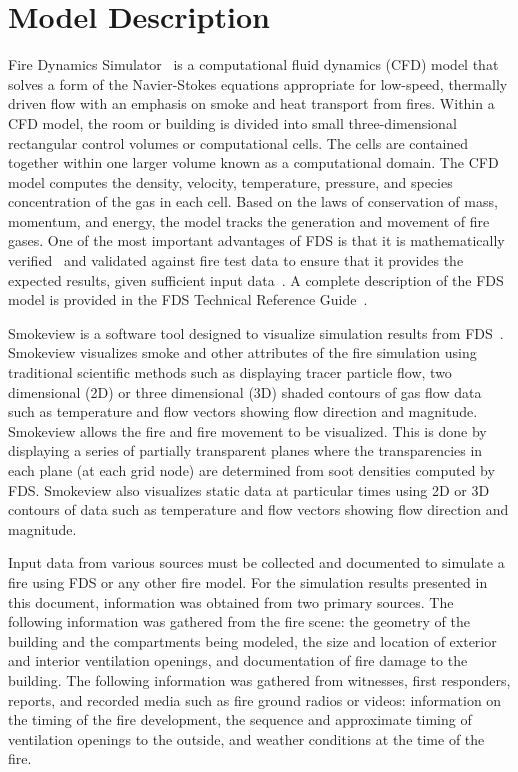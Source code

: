 \documentclass[12pt,oneside]{book}
\begin{document}
\chapter{Model Description}
\label{model}
Fire Dynamics Simulator~\cite{FDS_Users_Guide} is a computational fluid dynamics (CFD) model that solves a form of the Navier-Stokes equations appropriate for low-speed, thermally driven flow with an emphasis on smoke and heat transport from fires.  Within a CFD model, the room or building is divided into small three-dimensional rectangular control volumes or computational cells.  The cells are contained together within one larger volume known as a computational domain.  The CFD model computes the density, velocity, temperature, pressure, and species concentration of the gas in each cell.  Based on the laws of conservation of mass, momentum,  and energy, the model tracks the generation and movement of fire gases. One of the most important advantages of FDS is that it is  mathematically verified~\cite{FDS_Verification_Guide} and validated against fire test data to ensure that it provides the expected results, given sufficient input data~\cite{FDS_Validation_Guide}. A complete description of the FDS model is provided in the FDS Technical Reference Guide~\cite{FDS_Math_Guide}.

Smokeview is a software tool designed to visualize simulation results from FDS~\cite{Smokeview_Users_Guide}. Smokeview visualizes smoke and other attributes of the fire simulation using traditional scientific methods such as displaying tracer particle flow, two dimensional (2D) or three dimensional (3D) shaded contours of gas flow data such as temperature and flow vectors showing flow direction and magnitude. Smokeview allows the fire and fire movement to be visualized. This is done by displaying a series of partially transparent planes where the transparencies in each plane (at each grid node) are determined from soot densities computed by FDS. Smokeview also visualizes static data at particular times using 2D or 3D contours of data such as temperature and flow vectors showing flow direction and magnitude.

Input data from various sources must be collected and documented to simulate a fire using FDS or any other fire model. For the simulation results presented in this document, information was obtained from two primary sources. The following information was gathered from the fire scene: the geometry of the building and the compartments being modeled, the size and location of exterior and interior ventilation openings, and documentation of fire damage to the building. The following information was gathered from witnesses, first responders, reports, and recorded media such as fire ground radios or videos: information on the timing of the fire development, the sequence and approximate timing of ventilation openings to the outside, and weather conditions at the time of the fire. 
\end{document}
